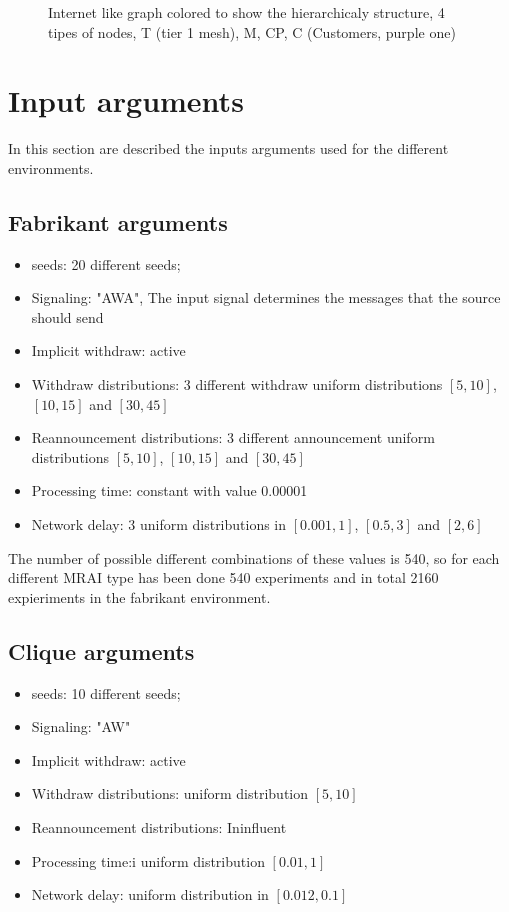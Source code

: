 \documentclass[10pt,conference,letterpaper]{IEEEtran}
\newcommand{\figvspace}{-1.5em}
\begin{document}
\begin{figure}[tb]
	\caption{Internet like graph colored to show the hierarchicaly structure, 4 tipes
			 of nodes, T (tier 1 mesh), M, CP, C (Customers, purple one)}
	\label{fig:internet_like_graph}
	\vspace{\figvspace}
\end{figure}

\section{Input arguments}
\label{sec:envDesc}

In this section are described the inputs arguments used for the different environments.

\subsection{Fabrikant arguments}
\label{sec:fabrikant_arguments}

\begin{itemize}
	\item seeds: \num{20} different seeds;
	\item Signaling: "AWA", The input signal determines the messages that 
		the source should send
	\item Implicit withdraw: active
	\item Withdraw distributions: \num{3} different withdraw uniform distributions
		$[5, 10]$, $[10, 15]$ and $[30, 45]$
	\item Reannouncement distributions: \num{3} different announcement uniform distributions
		$[5, 10]$, $[10, 15]$ and $[30, 45]$
	\item Processing time: constant with value \num{0.00001}
	\item Network delay: \num{3} uniform distributions in $[0.001, 1]$, $[0.5, 3]$ and $[2, 6]$
\end{itemize} 

The number of possible different combinations of these values is \num{540}, so 
for each different \ac{MRAI} type has been done \num{540} experiments and
in total \num{2160} expieriments in the fabrikant environment.

\subsection{Clique arguments}
\label{subsec:clique_arguments}

\begin{itemize}
	\item seeds: \num{10} different seeds;
	\item Signaling: "AW" 
	\item Implicit withdraw: active
	\item Withdraw distributions: uniform distribution $[5, 10]$
	\item Reannouncement distributions: Ininfluent 
	\item Processing time:i uniform distribution $[0.01, 1]$ 
	\item Network delay: uniform distribution in $[0.012, 0.1]$
\end{itemize} 
\end{document}
